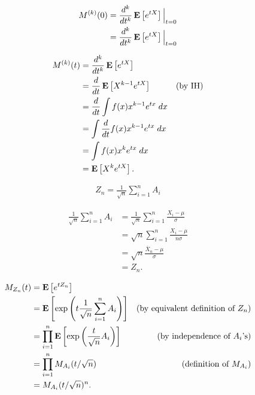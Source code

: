 \documentclass[11pt]{article}
\begin{document}
\begin{align*}
    M^{(k)}(0) & = \frac{d^k}{dt^k} \operatorname*{\mathbf{E}} \left[ e^{tX} \right] \Big|_{t=0} \\
               & = \frac{d^k}{dt^k} \operatorname*{\mathbf{E}} \left[ e^{tX} \right] \Big|_{t=0} \\
\end{align*}

\begin{align*}
    M^{(k)}(t) & = \frac{d^k}{dt^k} \operatorname*{\mathbf{E}} \left[ e^{tX} \right]                      \\
               & = \frac{d}{dt} \operatorname*{\mathbf{E}} \left[ X^{k-1} e^{tX} \right] & \text{(by IH)} \\
               & = \frac{d}{dt} \int f(x) x^{k-1} e^{tx} \; dx                    \\
               & = \int \frac{d}{dt} f(x) x^{k-1} e^{tx} \; dx                    \\
               & = \int f(x) x^{k} e^{tx} \; dx                                   \\
               & = \operatorname*{\mathbf{E}} \left[ X^{k} e^{tX} \right].
\end{align*}

\begin{align*}
    Z_n = \frac{1}{\sqrt{n}} \sum\limits_{i=1}^n A_i
\end{align*}

\begin{align*}
    \frac{1}{\sqrt{n}} \sum\limits_{i=1}^n A_i
     & = \frac{1}{\sqrt{n}} \sum\limits_{i=1}^n \frac{X_i - \mu}{\sigma} \\
     & = \sqrt{n} \sum\limits_{i=1}^n \frac{X_i - \mu}{ n \sigma}        \\
     & = \sqrt{n} \frac{\overline{X}_n - \mu}{ \sigma}                   \\
     & = Z_n.
\end{align*}

\begin{align*}
    M_{Z_n}(t) & = \operatorname*{\mathbf{E}} \left[ e^{t Z_n} \right]                                                                                                   \\
               & = \operatorname*{\mathbf{E}} \left[ \exp\left(t \frac{1}{\sqrt{n}} \sum\limits_{i=1}^n A_i \right) \right] & \text{(by equivalent definition of $Z_n$)} \\
               & = \prod_{i=1}^n \operatorname*{\mathbf{E}} \left[ \exp\left( \frac{t}{\sqrt{n}} A_i \right) \right]        & \text{(by independence of $A_i$'s)}        \\
               & = \prod_{i=1}^n M_{A_i}(t/\sqrt{n})                                                & \text{(definition of $M_{A_i}$)}           \\
               & = M_{A_i}(t/\sqrt{n} )^n .
\end{align*}
\end{document}
